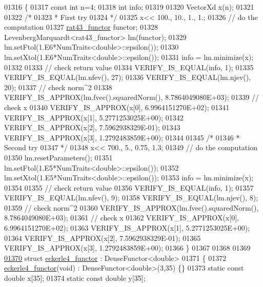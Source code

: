 \begin{DoxyCode}
01316 \{
01317   \textcolor{keyword}{const} \textcolor{keywordtype}{int} n=4;
01318   \textcolor{keywordtype}{int} info;
01319 
01320   VectorXd x(n);
01321 
01322   \textcolor{comment}{/*}
01323 \textcolor{comment}{   * First try}
01324 \textcolor{comment}{   */}
01325   x<< 100., 10., 1., 1.;
01326   \textcolor{comment}{// do the computation}
01327   \hyperlink{structrat43__functor}{rat43\_functor} functor;
01328   LevenbergMarquardt<rat43\_functor> lm(functor);
01329   lm.setFtol(1.E6*NumTraits<double>::epsilon());
01330   lm.setXtol(1.E6*NumTraits<double>::epsilon());
01331   info = lm.minimize(x);
01332 
01333   \textcolor{comment}{// check return value}
01334   VERIFY\_IS\_EQUAL(info, 1);
01335   VERIFY\_IS\_EQUAL(lm.nfev(), 27);
01336   VERIFY\_IS\_EQUAL(lm.njev(), 20);
01337   \textcolor{comment}{// check norm^2}
01338   VERIFY\_IS\_APPROX(lm.fvec().squaredNorm(), 8.7864049080E+03);
01339   \textcolor{comment}{// check x}
01340   VERIFY\_IS\_APPROX(x[0], 6.9964151270E+02);
01341   VERIFY\_IS\_APPROX(x[1], 5.2771253025E+00);
01342   VERIFY\_IS\_APPROX(x[2], 7.5962938329E-01);
01343   VERIFY\_IS\_APPROX(x[3], 1.2792483859E+00);
01344 
01345   \textcolor{comment}{/*}
01346 \textcolor{comment}{   * Second try}
01347 \textcolor{comment}{   */}
01348   x<< 700., 5., 0.75, 1.3;
01349   \textcolor{comment}{// do the computation}
01350   lm.resetParameters();
01351   lm.setFtol(1.E5*NumTraits<double>::epsilon());
01352   lm.setXtol(1.E5*NumTraits<double>::epsilon());
01353   info = lm.minimize(x);
01354 
01355   \textcolor{comment}{// check return value}
01356   VERIFY\_IS\_EQUAL(info, 1);
01357   VERIFY\_IS\_EQUAL(lm.nfev(), 9);
01358   VERIFY\_IS\_EQUAL(lm.njev(), 8);
01359   \textcolor{comment}{// check norm^2}
01360   VERIFY\_IS\_APPROX(lm.fvec().squaredNorm(), 8.7864049080E+03);
01361   \textcolor{comment}{// check x}
01362   VERIFY\_IS\_APPROX(x[0], 6.9964151270E+02);
01363   VERIFY\_IS\_APPROX(x[1], 5.2771253025E+00);
01364   VERIFY\_IS\_APPROX(x[2], 7.5962938329E-01);
01365   VERIFY\_IS\_APPROX(x[3], 1.2792483859E+00);
01366 \}
01367 
01368 
01369 
\hyperlink{structeckerle4__functor}{01370} \textcolor{keyword}{struct }\hyperlink{structeckerle4__functor}{eckerle4\_functor} : DenseFunctor<double>
01371 \{
01372     \hyperlink{structeckerle4__functor}{eckerle4\_functor}(\textcolor{keywordtype}{void}) : DenseFunctor<double>(3,35) \{\}
01373     \textcolor{keyword}{static} \textcolor{keyword}{const} \textcolor{keywordtype}{double} x[35];
01374     \textcolor{keyword}{static} \textcolor{keyword}{const} \textcolor{keywordtype}{double} y[35];

\end{DoxyCode}
